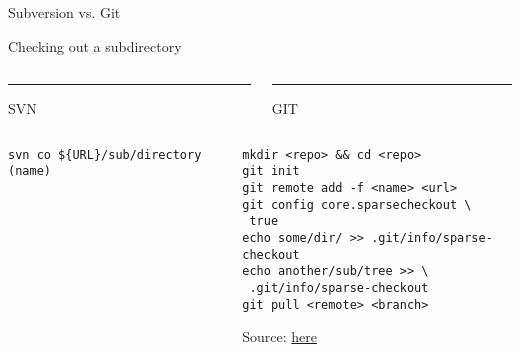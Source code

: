\documentclass[10pt,letterpaper]{beamer}
\begin{document}
\begin{frame}[fragile]{Subversion vs. Git}
\small
\begin{block}{Checking out a subdirectory}
\begin{columns}
\begin{column}{.48\textwidth}
\color{red}\rule{\linewidth}{4pt}

SVN
\end{column}%
\hfill%
\begin{column}{.48\textwidth}
\color{blue}\rule{\linewidth}{4pt}

GIT
\end{column}%
\end{columns}
\begin{columns}
\begin{column}{.48\textwidth}
\color{red}
\begin{verbatim}
svn co ${URL}/sub/directory (name)
\end{verbatim}
\end{column}%
\hfill%
\begin{column}{.48\textwidth}
\color{blue}\tiny
\begin{verbatim}
mkdir <repo> && cd <repo>
git init
git remote add -f <name> <url>
git config core.sparsecheckout \
 true
echo some/dir/ >> .git/info/sparse-checkout
echo another/sub/tree >> \
 .git/info/sparse-checkout
git pull <remote> <branch>
\end{verbatim}
{\tiny Source: \href{http://jasonkarns.com/blog/subdirectory-checkouts-with-git-sparse-checkout/}{here}}
\end{column}%

\end{columns}
\end{block}
\end{frame}
\end{document}
